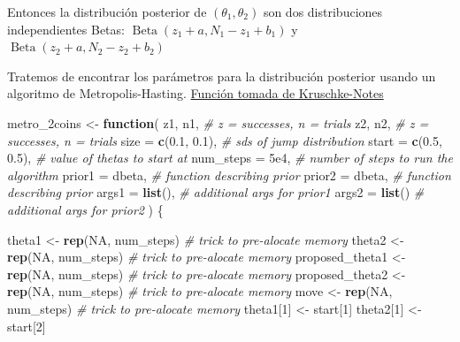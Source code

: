\documentclass[
  12pt,
]{book}
\newenvironment{Shaded}{\begin{snugshade}}{\end{snugshade}}
\newcommand{\CommentTok}[1]{\textcolor[rgb]{0.56,0.35,0.01}{\textit{#1}}}
\newcommand{\ControlFlowTok}[1]{\textcolor[rgb]{0.13,0.29,0.53}{\textbf{#1}}}
\newcommand{\DataTypeTok}[1]{\textcolor[rgb]{0.13,0.29,0.53}{#1}}
\newcommand{\DecValTok}[1]{\textcolor[rgb]{0.00,0.00,0.81}{#1}}
\newcommand{\FloatTok}[1]{\textcolor[rgb]{0.00,0.00,0.81}{#1}}
\newcommand{\KeywordTok}[1]{\textcolor[rgb]{0.13,0.29,0.53}{\textbf{#1}}}
\newcommand{\NormalTok}[1]{#1}
\newcommand{\OtherTok}[1]{\textcolor[rgb]{0.56,0.35,0.01}{#1}}
\newcommand{\StringTok}[1]{\textcolor[rgb]{0.31,0.60,0.02}{#1}}
\theoremstyle{definition}
\theoremstyle{definition}
\theoremstyle{definition}
\theoremstyle{remark}
\begin{document}
Entonces la distribución posterior de \(\left(\theta_{1}, \theta_{2}\right)\) son dos distribuciones independientes Betas:
\(\operatorname{Beta}\left(z_{1}+a, N_{1}-z_{1}+b_{1}\right)\) y \(\operatorname{Beta}\left(z_{2}+a, N_{2}-z_{2}+b_{2}\right)\)

Tratemos de encontrar los parámetros para la distribución posterior usando un algoritmo de Metropolis-Hasting. \href{https://rpruim.github.io/Kruschke-Notes/markov-chain-monte-carlo-mcmc.html\#metropolis}{Función tomada de Kruschke-Notes}

\begin{Shaded}
\begin{Highlighting}[]
\NormalTok{metro_2coins <-}\StringTok{ }\ControlFlowTok{function}\NormalTok{(}
\NormalTok{  z1, n1,              }\CommentTok{# z = successes, n = trials}
\NormalTok{  z2, n2,              }\CommentTok{# z = successes, n = trials}
  \DataTypeTok{size  =} \KeywordTok{c}\NormalTok{(}\FloatTok{0.1}\NormalTok{, }\FloatTok{0.1}\NormalTok{), }\CommentTok{# sds of jump distribution}
  \DataTypeTok{start =} \KeywordTok{c}\NormalTok{(}\FloatTok{0.5}\NormalTok{, }\FloatTok{0.5}\NormalTok{), }\CommentTok{# value of thetas to start at}
  \DataTypeTok{num_steps =} \FloatTok{5e4}\NormalTok{,     }\CommentTok{# number of steps to run the algorithm}
  \DataTypeTok{prior1 =}\NormalTok{ dbeta,      }\CommentTok{# function describing prior}
  \DataTypeTok{prior2 =}\NormalTok{ dbeta,      }\CommentTok{# function describing prior}
  \DataTypeTok{args1 =} \KeywordTok{list}\NormalTok{(),      }\CommentTok{# additional args for prior1}
  \DataTypeTok{args2 =} \KeywordTok{list}\NormalTok{()      }\CommentTok{# additional args for prior2}
\NormalTok{  ) \{}
  
\NormalTok{  theta1            <-}\StringTok{ }\KeywordTok{rep}\NormalTok{(}\OtherTok{NA}\NormalTok{, num_steps)  }\CommentTok{# trick to pre-alocate memory}
\NormalTok{  theta2            <-}\StringTok{ }\KeywordTok{rep}\NormalTok{(}\OtherTok{NA}\NormalTok{, num_steps)  }\CommentTok{# trick to pre-alocate memory}
\NormalTok{  proposed_theta1   <-}\StringTok{ }\KeywordTok{rep}\NormalTok{(}\OtherTok{NA}\NormalTok{, num_steps)  }\CommentTok{# trick to pre-alocate memory}
\NormalTok{  proposed_theta2   <-}\StringTok{ }\KeywordTok{rep}\NormalTok{(}\OtherTok{NA}\NormalTok{, num_steps)  }\CommentTok{# trick to pre-alocate memory}
\NormalTok{  move              <-}\StringTok{ }\KeywordTok{rep}\NormalTok{(}\OtherTok{NA}\NormalTok{, num_steps)  }\CommentTok{# trick to pre-alocate memory}
\NormalTok{  theta1[}\DecValTok{1}\NormalTok{]         <-}\StringTok{ }\NormalTok{start[}\DecValTok{1}\NormalTok{]}
\NormalTok{  theta2[}\DecValTok{1}\NormalTok{]         <-}\StringTok{ }\NormalTok{start[}\DecValTok{2}\NormalTok{]}


\end{Highlighting}
\end{Shaded}
\end{document}
